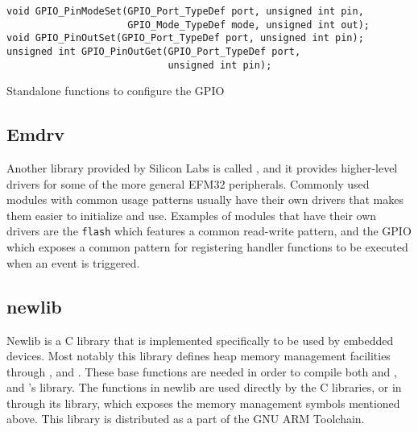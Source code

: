 \begin{listing}[H]
  \begin{verbatim}
void GPIO_PinModeSet(GPIO_Port_TypeDef port, unsigned int pin,
                     GPIO_Mode_TypeDef mode, unsigned int out);
void GPIO_PinOutSet(GPIO_Port_TypeDef port, unsigned int pin);
unsigned int GPIO_PinOutGet(GPIO_Port_TypeDef port,
                            unsigned int pin);
  \end{verbatim}
  \caption{Standalone functions to configure the GPIO}
  \label{lst:back:lib:gpio}
\end{listing}

\subsection{Emdrv}

Another library provided by Silicon Labs is called \emdrv, and it provides higher-level drivers for some of the more general EFM32 peripherals.
Commonly used modules with common usage patterns usually have their own drivers that makes them easier to initialize and use.
Examples of modules that have their own drivers are the \texttt{flash} which features a common read-write pattern, and the GPIO which exposes a common pattern for registering handler functions to be executed when an event is triggered.

\subsection{newlib}

Newlib is a C library that is implemented specifically to be used by embedded devices.
Most notably this library defines heap memory management facilities through ,  and .
These base functions are needed in order to compile both \emlib and , and \rust's  library.
The functions in newlib are used directly by the C libraries, or in \rust through its  library, which exposes the memory management symbols mentioned above.
This library is distributed as a part of the GNU ARM Toolchain.
